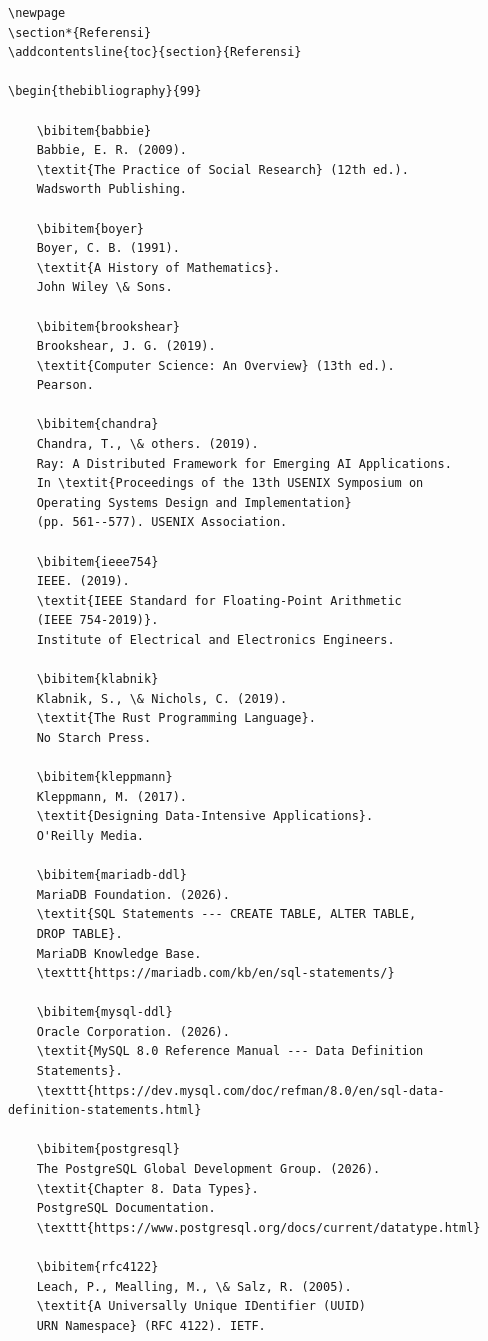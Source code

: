 \documentclass[11pt,a4paper]{article}
\begin{document}
\begin{lstlisting}[style=code]
\newpage
\section*{Referensi}
\addcontentsline{toc}{section}{Referensi}

\begin{thebibliography}{99}

	\bibitem{babbie}
	Babbie, E. R. (2009).
	\textit{The Practice of Social Research} (12th ed.).
	Wadsworth Publishing.

	\bibitem{boyer}
	Boyer, C. B. (1991).
	\textit{A History of Mathematics}.
	John Wiley \& Sons.

	\bibitem{brookshear}
	Brookshear, J. G. (2019).
	\textit{Computer Science: An Overview} (13th ed.).
	Pearson.

	\bibitem{chandra}
	Chandra, T., \& others. (2019).
	Ray: A Distributed Framework for Emerging AI Applications.
	In \textit{Proceedings of the 13th USENIX Symposium on
	Operating Systems Design and Implementation}
	(pp. 561--577). USENIX Association.

	\bibitem{ieee754}
	IEEE. (2019).
	\textit{IEEE Standard for Floating-Point Arithmetic
	(IEEE 754-2019)}.
	Institute of Electrical and Electronics Engineers.

	\bibitem{klabnik}
	Klabnik, S., \& Nichols, C. (2019).
	\textit{The Rust Programming Language}.
	No Starch Press.

	\bibitem{kleppmann}
	Kleppmann, M. (2017).
	\textit{Designing Data-Intensive Applications}.
	O'Reilly Media.

	\bibitem{mariadb-ddl}
	MariaDB Foundation. (2026).
	\textit{SQL Statements --- CREATE TABLE, ALTER TABLE,
	DROP TABLE}.
	MariaDB Knowledge Base.
	\texttt{https://mariadb.com/kb/en/sql-statements/}

	\bibitem{mysql-ddl}
	Oracle Corporation. (2026).
	\textit{MySQL 8.0 Reference Manual --- Data Definition
	Statements}.
	\texttt{https://dev.mysql.com/doc/refman/8.0/en/sql-data-definition-statements.html}

	\bibitem{postgresql}
	The PostgreSQL Global Development Group. (2026).
	\textit{Chapter 8. Data Types}.
	PostgreSQL Documentation.
	\texttt{https://www.postgresql.org/docs/current/datatype.html}

	\bibitem{rfc4122}
	Leach, P., Mealling, M., \& Salz, R. (2005).
	\textit{A Universally Unique IDentifier (UUID)
	URN Namespace} (RFC 4122). IETF.


\end{lstlisting}
\end{document}
